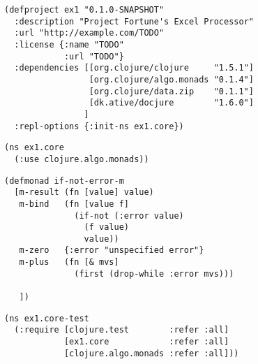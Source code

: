 \documentclass[11pt]{article}
\begin{document}
\begin{figure}[H]
\label{project-file}
\begin{verbatim}
(defproject ex1 "0.1.0-SNAPSHOT"
  :description "Project Fortune's Excel Processor"
  :url "http://example.com/TODO"
  :license {:name "TODO"
            :url "TODO"}
  :dependencies [[org.clojure/clojure     "1.5.1"]
                 [org.clojure/algo.monads "0.1.4"]
                 [org.clojure/data.zip    "0.1.1"]
                 [dk.ative/docjure        "1.6.0"]
                ]
  :repl-options {:init-ns ex1.core})
\end{verbatim}
\end{figure}

\begin{figure}[H]
\label{main-namespace}
\begin{verbatim}
(ns ex1.core
  (:use clojure.algo.monads))
\end{verbatim}
\end{figure}

\begin{figure}[H]
\label{main-monad}
\begin{verbatim}
(defmonad if-not-error-m
  [m-result (fn [value] value)
   m-bind   (fn [value f]
              (if-not (:error value)
                (f value) 
                value))
   m-zero   {:error "unspecified error"}
   m-plus   (fn [& mvs]
              (first (drop-while :error mvs)))

   ])
\end{verbatim}
\end{figure}

\begin{figure}[H]
\label{main-test-namespace}
\begin{verbatim}
(ns ex1.core-test
  (:require [clojure.test        :refer :all]
            [ex1.core            :refer :all]
            [clojure.algo.monads :refer :all]))
\end{verbatim}
\end{figure}
\end{document}
